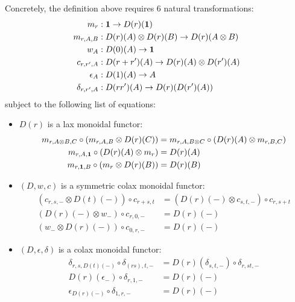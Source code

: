 Concretely, the definition above requires 6 natural transformations:
\begin{align*}
m_{r} & :\mathbf{1}\to  D(r)(\mathbf{1})\\
m_{r,A,B}& :  D(r)(A)\otimes D(r)(B)\to  D(r)(A\otimes B)\\
w_{A}& : D(0)(A)\to \mathbf{1} \\
c_{r,r',A}& : D(r+r')(A) \to D(r)(A)\otimes D(r')(A) \\
\epsilon_{A}& : D(1)(A)\to A \\
\delta_{r,r',A}&: D(r r')(A)\to D(r)(D(r')(A))
\end{align*}
subject to the following list of equations:
\begin{itemize}
\item $D(r)$ is a lax monoidal functor:
\begin{align}
m_{r,A\otimes B,C}\circ (m_{r,A,B}\otimes D(r)(C)) & = 
m_{r,A, B\otimes C}\circ (D(r)(A)\otimes m_{r,B,C})\\
m_{r,A,\mathbf{1}}\circ (D(r)(A)\otimes m_{r}) & = D(r)(A)\\
m_{r,\mathbf{1}, B}\circ (m_{r}\otimes D(r)(B))&= D(r)(B)
\end{align}


\item $(D,w,c)$ is a symmetric colax monoidal functor:
\begin{align}
(c_{r,s,-}\otimes D(t)(-))\circ c_{r+s,t} & =
(D(r)(-)\otimes c_{s,t,-})\circ c_{r,s+t}\\
(D(r)(-)\otimes w_{-})\circ c_{r,0,-} & = D(r)(-) \\
(w_{-}\otimes D(r)(-))\circ c_{0,r,-} & = D(r)(-)
\end{align}


\item $(D,\epsilon,\delta)$ is a colax monoidal functor:
\begin{align}
\delta_{r,s, D(t)(-)}\circ \delta_{(rs),t,-} & =
D(r)(\delta_{s,t,-})\circ \delta_{r,st,-}\\
D(r)(\epsilon_{-}) \circ \delta_{r,1,-} & = D(r)(-) \\
\epsilon_{D(r)(-)} \circ \delta_{1,r,-} & = D(r)(-)
\end{align}

\end{itemize}



